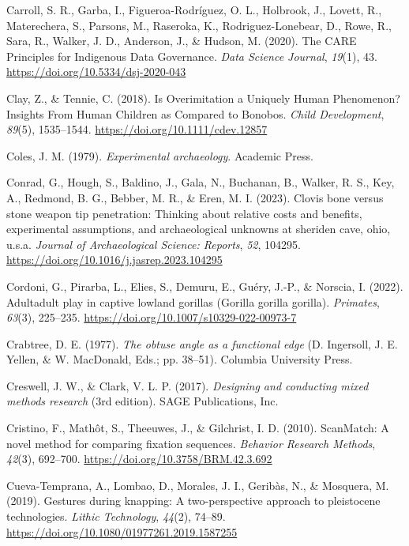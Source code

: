\documentclass[
  11pt,
  letterpaper,
  DIV=11,
  numbers=noendperiod]{scrartcl}
\newlength{\cslhangindent}
\newenvironment{CSLReferences}[2] %
 {\begin{list}{}{%
  \setlength{\itemindent}{0pt}
  \setlength{\leftmargin}{0pt}
  \setlength{\parsep}{0pt}
  \ifodd #1
   \setlength{\leftmargin}{\cslhangindent}
   \setlength{\itemindent}{-1\cslhangindent}
  \fi
  \setlength{\itemsep}{#2\baselineskip}}}
 {\end{list}}
\begin{document}
\begin{CSLReferences}{1}{0}
Carroll, S. R., Garba, I., Figueroa-Rodríguez, O. L., Holbrook, J.,
Lovett, R., Materechera, S., Parsons, M., Raseroka, K.,
Rodriguez-Lonebear, D., Rowe, R., Sara, R., Walker, J. D., Anderson, J.,
\& Hudson, M. (2020). The CARE Principles for Indigenous Data
Governance. \emph{Data Science Journal}, \emph{19}(1), 43.
\url{https://doi.org/10.5334/dsj-2020-043}

Clay, Z., \& Tennie, C. (2018). Is Overimitation a Uniquely Human
Phenomenon? Insights From Human Children as Compared to Bonobos.
\emph{Child Development}, \emph{89}(5), 1535--1544.
\url{https://doi.org/10.1111/cdev.12857}

Coles, J. M. (1979). \emph{Experimental archaeology}. Academic Press.

Conrad, G., Hough, S., Baldino, J., Gala, N., Buchanan, B., Walker, R.
S., Key, A., Redmond, B. G., Bebber, M. R., \& Eren, M. I. (2023).
Clovis bone versus stone weapon tip penetration: Thinking about relative
costs and benefits, experimental assumptions, and archaeological
unknowns at sheriden cave, ohio, u.s.a. \emph{Journal of Archaeological
Science: Reports}, \emph{52}, 104295.
\url{https://doi.org/10.1016/j.jasrep.2023.104295}

Cordoni, G., Pirarba, L., Elies, S., Demuru, E., Guéry, J.-P., \&
Norscia, I. (2022). Adult{\textendash}adult play in captive lowland
gorillas (Gorilla gorilla gorilla). \emph{Primates}, \emph{63}(3),
225--235. \url{https://doi.org/10.1007/s10329-022-00973-7}

Crabtree, D. E. (1977). \emph{The obtuse angle as a functional edge} (D.
Ingersoll, J. E. Yellen, \& W. MacDonald, Eds.; pp. 38--51). Columbia
University Press.

Creswell, J. W., \& Clark, V. L. P. (2017). \emph{Designing and
conducting mixed methods research} (3rd edition). SAGE Publications,
Inc.

Cristino, F., Mathôt, S., Theeuwes, J., \& Gilchrist, I. D. (2010).
ScanMatch: A novel method for comparing fixation sequences.
\emph{Behavior Research Methods}, \emph{42}(3), 692--700.
\url{https://doi.org/10.3758/BRM.42.3.692}

Cueva-Temprana, A., Lombao, D., Morales, J. I., Geribàs, N., \&
Mosquera, M. (2019). Gestures during knapping: A two-perspective
approach to pleistocene technologies. \emph{Lithic Technology},
\emph{44}(2), 74--89.
\url{https://doi.org/10.1080/01977261.2019.1587255}


\end{CSLReferences}
\end{document}
